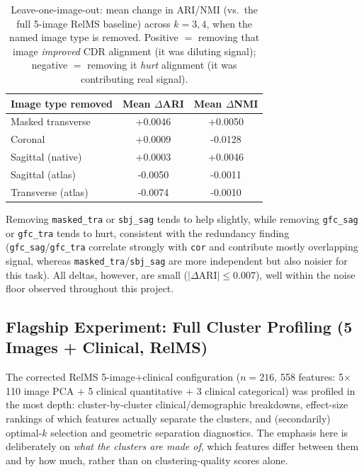 \documentclass[11pt, a4paper]{article}
\begin{document}
\begin{table}[H]
\centering
\caption{Leave-one-image-out: mean change in ARI/NMI (vs.\ the full 5-image RelMS baseline) across
$k=3,4$, when the named image type is removed. Positive $=$ removing that image \emph{improved}
CDR alignment (it was diluting signal); negative $=$ removing it \emph{hurt} alignment (it was
contributing real signal).}
\begin{tabular}{lcc}
\toprule
\textbf{Image type removed} & \textbf{Mean $\Delta$ARI} & \textbf{Mean $\Delta$NMI} \\
\midrule
Masked transverse & +0.0046 & +0.0050 \\
Coronal & +0.0009 & -0.0128 \\
Sagittal (native) & +0.0003 & +0.0046 \\
Sagittal (atlas) & -0.0050 & -0.0011 \\
Transverse (atlas) & -0.0074 & -0.0010 \\
\bottomrule
\end{tabular}
\end{table}

\noindent Removing \texttt{masked\_tra} or \texttt{sbj\_sag} tends to help slightly, while removing
\texttt{gfc\_sag} or \texttt{gfc\_tra} tends to hurt, consistent with the redundancy finding
(\texttt{gfc\_sag}/\texttt{gfc\_tra} correlate strongly with \texttt{cor} and contribute mostly
overlapping signal, whereas \texttt{masked\_tra}/\texttt{sbj\_sag} are more independent but also
noisier for this task). All deltas, however, are small ($|\Delta\mathrm{ARI}| \leq 0.007$), well
within the noise floor observed throughout this project.

\subsection{Flagship Experiment: Full Cluster Profiling (5 Images + Clinical, RelMS)}
\label{sec:flagship}

The corrected RelMS 5-image+clinical configuration ($n=216$, 558 features: 5$\times$110 image PCA
+ 5 clinical quantitative + 3 clinical categorical) was profiled in the most depth: cluster-by-cluster
clinical/demographic breakdowns, effect-size rankings of which features actually separate the
clusters, and (secondarily) optimal-$k$ selection and geometric separation diagnostics. The emphasis
here is deliberately on \emph{what the clusters are made of}, which features differ between them
and by how much, rather than on clustering-quality scores alone.
\end{document}
